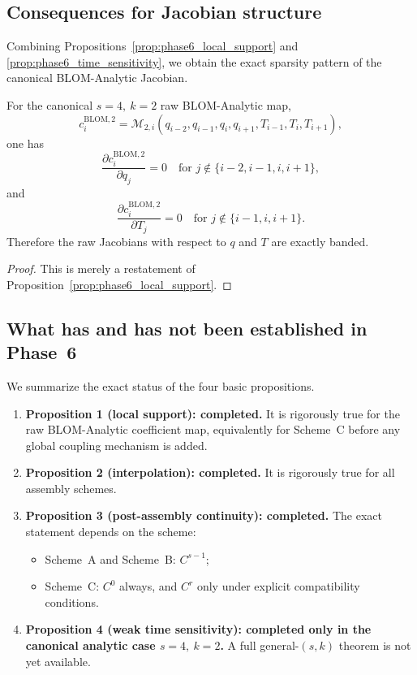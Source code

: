 \subsection{Consequences for Jacobian structure}
\label{subsec:phase6_jacobian_structure}

Combining Propositions~\ref{prop:phase6_local_support} and \ref{prop:phase6_time_sensitivity}, we obtain the exact sparsity pattern of the canonical BLOM-Analytic Jacobian.

\begin{corollary}
\label{cor:phase6_jacobian_banded}
For the canonical \(s=4,\ k=2\) raw BLOM-Analytic map,
\[
c_i^{\mathrm{BLOM},2}
=
\mathcal M_{2,i}(q_{i-2},q_{i-1},q_i,q_{i+1},T_{i-1},T_i,T_{i+1}),
\]
one has
\[
\frac{\partial c_i^{\mathrm{BLOM},2}}{\partial q_j}=0
\quad\text{for } j\notin\{i-2,i-1,i,i+1\},
\]
and
\[
\frac{\partial c_i^{\mathrm{BLOM},2}}{\partial T_j}=0
\quad\text{for } j\notin\{i-1,i,i+1\}.
\]
Therefore the raw Jacobians with respect to \(q\) and \(T\) are exactly banded.
\end{corollary}

\begin{proof}
This is merely a restatement of Proposition~\ref{prop:phase6_local_support}.
\end{proof}

\subsection{What has and has not been established in Phase~6}
\label{subsec:phase6_summary}

We summarize the exact status of the four basic propositions.

\begin{enumerate}
    \item \textbf{Proposition 1 (local support): completed.}  
    It is rigorously true for the raw BLOM-Analytic coefficient map, equivalently for Scheme~C before any global coupling mechanism is added.

    \item \textbf{Proposition 2 (interpolation): completed.}  
    It is rigorously true for all assembly schemes.

    \item \textbf{Proposition 3 (post-assembly continuity): completed.}  
    The exact statement depends on the scheme:
    \begin{itemize}
        \item Scheme~A and Scheme~B: \(C^{s-1}\);
        \item Scheme~C: \(C^0\) always, and \(C^r\) only under explicit compatibility conditions.
    \end{itemize}

    \item \textbf{Proposition 4 (weak time sensitivity): completed only in the canonical analytic case \(s=4,\ k=2\).}  
    A full general-\((s,k)\) theorem is not yet available.
\end{enumerate}


